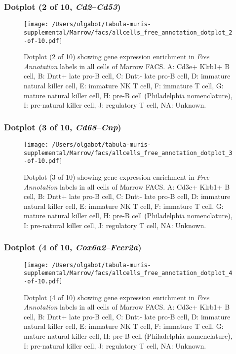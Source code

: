 \clearpage

\subsubsection{Dotplot (2 of 10, \emph{Cd2}--\emph{Cd53})}
\begin{figure}[h]
\centering
\texttt{[image: /Users/olgabot/tabula-muris-supplemental/Marrow/facs/allcells\_free\_annotation\_dotplot\_2-of-10.pdf]}

\caption{ Dotplot (2 of 10)  showing gene expression enrichment in \emph{Free Annotation} labels in all cells of Marrow FACS. A: Cd3e+ Klrb1+ B cell, B: Dntt+ late pro-B cell, C: Dntt- late pro-B cell, D: immature natural killer cell, E: immature NK T cell, F: immature T cell, G: mature natural killer cell, H: pre-B cell (Philadelphia nomenclature), I: pre-natural killer cell, J: regulatory T cell, NA: Unknown.}
\end{figure}


\clearpage

\subsubsection{Dotplot (3 of 10, \emph{Cd68}--\emph{Cnp})}
\begin{figure}[h]
\centering
\texttt{[image: /Users/olgabot/tabula-muris-supplemental/Marrow/facs/allcells\_free\_annotation\_dotplot\_3-of-10.pdf]}

\caption{ Dotplot (3 of 10)  showing gene expression enrichment in \emph{Free Annotation} labels in all cells of Marrow FACS. A: Cd3e+ Klrb1+ B cell, B: Dntt+ late pro-B cell, C: Dntt- late pro-B cell, D: immature natural killer cell, E: immature NK T cell, F: immature T cell, G: mature natural killer cell, H: pre-B cell (Philadelphia nomenclature), I: pre-natural killer cell, J: regulatory T cell, NA: Unknown.}
\end{figure}


\clearpage

\subsubsection{Dotplot (4 of 10, \emph{Cox6a2}--\emph{Fcer2a})}
\begin{figure}[h]
\centering
\texttt{[image: /Users/olgabot/tabula-muris-supplemental/Marrow/facs/allcells\_free\_annotation\_dotplot\_4-of-10.pdf]}

\caption{ Dotplot (4 of 10)  showing gene expression enrichment in \emph{Free Annotation} labels in all cells of Marrow FACS. A: Cd3e+ Klrb1+ B cell, B: Dntt+ late pro-B cell, C: Dntt- late pro-B cell, D: immature natural killer cell, E: immature NK T cell, F: immature T cell, G: mature natural killer cell, H: pre-B cell (Philadelphia nomenclature), I: pre-natural killer cell, J: regulatory T cell, NA: Unknown.}
\end{figure}



